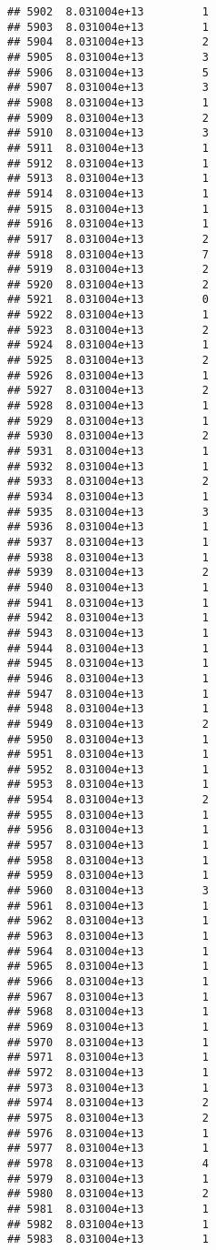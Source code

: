 \documentclass[
]{article}
\begin{document}
\begin{verbatim}
## 5902  8.031004e+13         1
## 5903  8.031004e+13         1
## 5904  8.031004e+13         2
## 5905  8.031004e+13         3
## 5906  8.031004e+13         5
## 5907  8.031004e+13         3
## 5908  8.031004e+13         1
## 5909  8.031004e+13         2
## 5910  8.031004e+13         3
## 5911  8.031004e+13         1
## 5912  8.031004e+13         1
## 5913  8.031004e+13         1
## 5914  8.031004e+13         1
## 5915  8.031004e+13         1
## 5916  8.031004e+13         1
## 5917  8.031004e+13         2
## 5918  8.031004e+13         7
## 5919  8.031004e+13         2
## 5920  8.031004e+13         2
## 5921  8.031004e+13         0
## 5922  8.031004e+13         1
## 5923  8.031004e+13         2
## 5924  8.031004e+13         1
## 5925  8.031004e+13         2
## 5926  8.031004e+13         1
## 5927  8.031004e+13         2
## 5928  8.031004e+13         1
## 5929  8.031004e+13         1
## 5930  8.031004e+13         2
## 5931  8.031004e+13         1
## 5932  8.031004e+13         1
## 5933  8.031004e+13         2
## 5934  8.031004e+13         1
## 5935  8.031004e+13         3
## 5936  8.031004e+13         1
## 5937  8.031004e+13         1
## 5938  8.031004e+13         1
## 5939  8.031004e+13         2
## 5940  8.031004e+13         1
## 5941  8.031004e+13         1
## 5942  8.031004e+13         1
## 5943  8.031004e+13         1
## 5944  8.031004e+13         1
## 5945  8.031004e+13         1
## 5946  8.031004e+13         1
## 5947  8.031004e+13         1
## 5948  8.031004e+13         1
## 5949  8.031004e+13         2
## 5950  8.031004e+13         1
## 5951  8.031004e+13         1
## 5952  8.031004e+13         1
## 5953  8.031004e+13         1
## 5954  8.031004e+13         2
## 5955  8.031004e+13         1
## 5956  8.031004e+13         1
## 5957  8.031004e+13         1
## 5958  8.031004e+13         1
## 5959  8.031004e+13         1
## 5960  8.031004e+13         3
## 5961  8.031004e+13         1
## 5962  8.031004e+13         1
## 5963  8.031004e+13         1
## 5964  8.031004e+13         1
## 5965  8.031004e+13         1
## 5966  8.031004e+13         1
## 5967  8.031004e+13         1
## 5968  8.031004e+13         1
## 5969  8.031004e+13         1
## 5970  8.031004e+13         1
## 5971  8.031004e+13         1
## 5972  8.031004e+13         1
## 5973  8.031004e+13         1
## 5974  8.031004e+13         2
## 5975  8.031004e+13         2
## 5976  8.031004e+13         1
## 5977  8.031004e+13         1
## 5978  8.031004e+13         4
## 5979  8.031004e+13         1
## 5980  8.031004e+13         2
## 5981  8.031004e+13         1
## 5982  8.031004e+13         1
## 5983  8.031004e+13         1

\end{verbatim}
\end{document}
